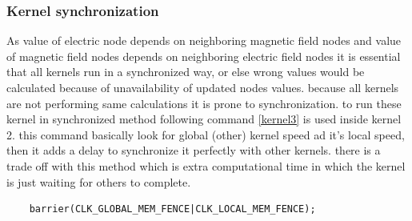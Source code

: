 \subsubsection{Kernel synchronization}
As value of electric node depends on neighboring magnetic field nodes and value of magnetic field nodes  depends on neighboring electric field nodes it is essential that all kernels run in a synchronized way, or else wrong values would be calculated because of unavailability of updated nodes values. because all kernels are not performing same calculations it is prone to synchronization. to run these kernel in synchronized method following command \ref{kernel3}  is used inside kernel 2. this command basically look for global (other) kernel speed ad it's local speed, then it adds a delay to synchronize it perfectly with other kernels. there is a trade off with this method which is extra computational time in which the kernel is just waiting for others to complete.
\lstset{language=C,caption=Kernel synchronization, label=kernel3}
\begin{lstlisting}
	barrier(CLK_GLOBAL_MEM_FENCE|CLK_LOCAL_MEM_FENCE);
\end{lstlisting}











